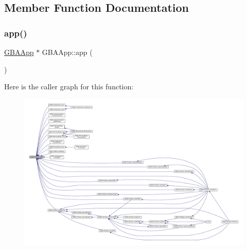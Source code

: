 \subsection{Member Function Documentation}
\mbox{\label{class_q_g_b_a_1_1_g_b_a_app_a25af17e1ffd425419cafa67197ba4fe5}} 
\subsubsection{\texorpdfstring{app()}{app()}}
{\footnotesize\ttfamily \mbox{\hyperlink{class_q_g_b_a_1_1_g_b_a_app}{G\+B\+A\+App}} $\ast$ G\+B\+A\+App\+::app (\begin{DoxyParamCaption}{ }\end{DoxyParamCaption})\hspace{0.3cm}{\ttfamily [static]}}

Here is the caller graph for this function\+:
\nopagebreak
\begin{figure}[H]
\begin{center}
\leavevmode
\includegraphics[width=350pt]{class_q_g_b_a_1_1_g_b_a_app_a25af17e1ffd425419cafa67197ba4fe5_icgraph}
\end{center}
\end{figure}
\mbox{\label{class_q_g_b_a_1_1_g_b_a_app_ae97c0144542f4d9d2b7301ae5097816f}} 
